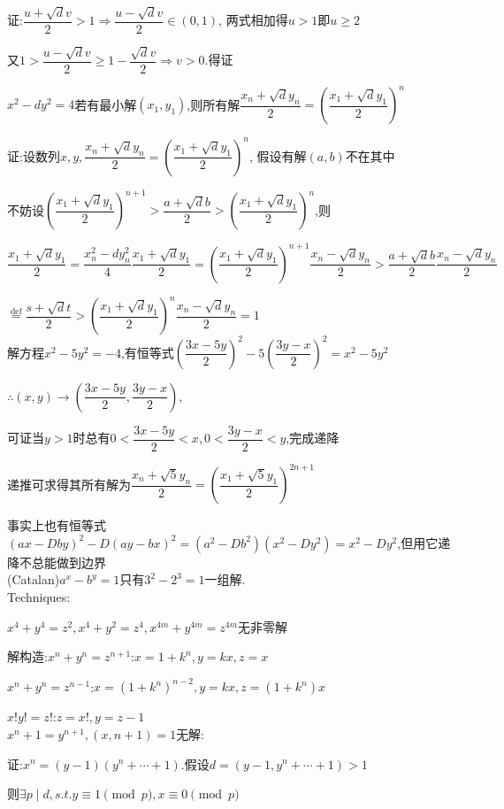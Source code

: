 证:$ \dfrac{u+\sqrt{d}v}{2}>1\Rightarrow \dfrac{u-\sqrt{d}v}{2}\in(0,1)$,
两式相加得$ u>1$即$ u\ge 2$

又$ 1>\dfrac{u-\sqrt{d}v}{2}\ge 1-\dfrac{\sqrt{d}v}{2}\Rightarrow v>0$.得证

$ x^2-dy^2=4$若有最小解$ (x_1,y_1)$,则所有解$ \dfrac{x_n+\sqrt{d}y_n}{2}=(\dfrac{x_1+\sqrt{d}y_1}{2})^n$

证:设数列$x,y, \dfrac{x_n+\sqrt{d}y_n}{2}=(\dfrac{x_1+\sqrt{d}y_1}{2})^n$,
假设有解$ (a,b)$不在其中

不妨设$ ( \dfrac{x_1+\sqrt{d}y_1}{2})^{n+1}>\dfrac{a+\sqrt{d}b}{2}>(\dfrac{x_1+\sqrt{d}y_1}{2})^n$,则

$   \dfrac{x_1+\sqrt{d}y_1}{2}=\dfrac{x_n^2-dy_n^2}{4}\dfrac{x_1+\sqrt{d}y_1}{2}=(\dfrac{x_1+\sqrt{d}y_1}{2})^{n+1}\dfrac{x_n-\sqrt{d}y_n}{2}>\dfrac{a+\sqrt{d}b}{2}\dfrac{x_n-\sqrt{d}y_n}{2} $ 

$  \overset{\text{def}}{=} \dfrac{s+\sqrt{d}t}{2}>(\dfrac{x_1+\sqrt{d}y_1}{2})^n\dfrac{x_n-\sqrt{d}y_n}{2}=1$ 
\\

解方程$ x^2-5y^2=-4$,有恒等式$ (\dfrac{3x-5y}{2})^2-5(\dfrac{3y-x}{2})^2=x^2-5y^2$

$ \therefore (x,y)\rightarrow (\dfrac{3x-5y}{2},\dfrac{3y-x}{2}),$

可证当$ y>1$时总有$ 0<\dfrac{3x-5y}{2}<x,0<\dfrac{3y-x}{2}<y$,完成递降

递推可求得其所有解为$ \dfrac{x_n+\sqrt{5}y_n}{2}=(\dfrac{x_1+\sqrt{5}y_1}{2})^{2n+1}$

事实上也有恒等式$ (ax-Dby)^2-D(ay-bx)^2=(a^2-Db^2)(x^2-Dy^2)=x^2-Dy^2$,但用它递降不总能做到边界
\\

(Catalan)$ a^x-b^y=1$只有$ 3^2-2^3=1$一组解.
\\

Techniques:

$ x^4+y^4=z^2 ,x^4+y^2=z^4, x^{4m}+y^{4m}=z^{4m} $无非零解

解构造:$ x^n+y^n=z^{n+1}$:$ x=1+k^n,y=kx,z=x$

$ x^n+y^n=z^{n-1}$:$ x=(1+k^n)^{n-2},y=kx,z=(1+k^n)x$ 

$ x!y!=z!$:$ z=x!,y=z-1$
\\

$ x^n+1=y^{n+1},(x,n+1)=1$无解:

证:$ x^n=(y-1)(y^n+\cdots +1)$.假设$ d=(y-1,y^n+\cdots +1)>1$

则$ \exists p \mid d ,s.t.y \equiv 1 \pmod p ,x\equiv 0 \pmod p$

